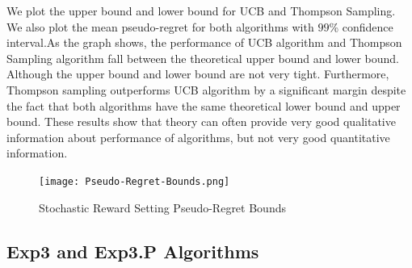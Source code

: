 \documentclass[12pt]{article}
\begin{document}
We plot the upper bound and lower bound for UCB and Thompson Sampling. We also plot the mean pseudo-regret for both algorithms with $99$\% confidence interval.As the graph shows, the performance of UCB algorithm and Thompson Sampling algorithm fall between the theoretical upper bound and lower bound. Although the upper bound and lower bound are not very tight. Furthermore, Thompson sampling outperforms UCB algorithm by a significant margin despite the fact that both algorithms have the same theoretical lower bound and upper bound. These results show that theory can often provide very good qualitative information about performance of algorithms, but not very good quantitative information.

\begin{figure}[tb]
  \texttt{[image: Pseudo-Regret-Bounds.png]}
  \captionsetup{justification=centering}
  \caption{Stochastic Reward Setting Pseudo-Regret Bounds}
\end{figure}

\subsection{Exp3 and Exp3.P Algorithms}
\end{document}
